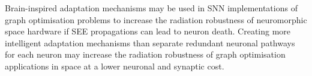 Brain-inspired adaptation mechanisms may be used in SNN implementations of graph optimisation problems to increase the radiation robustness of neuromorphic space hardware if SEE propagations can lead to neuron death. Creating more intelligent adaptation mechanisms than separate redundant neuronal pathways for each neuron may increase the radiation robustness of graph optimisation applications  in space at a lower neuronal and synaptic cost.
